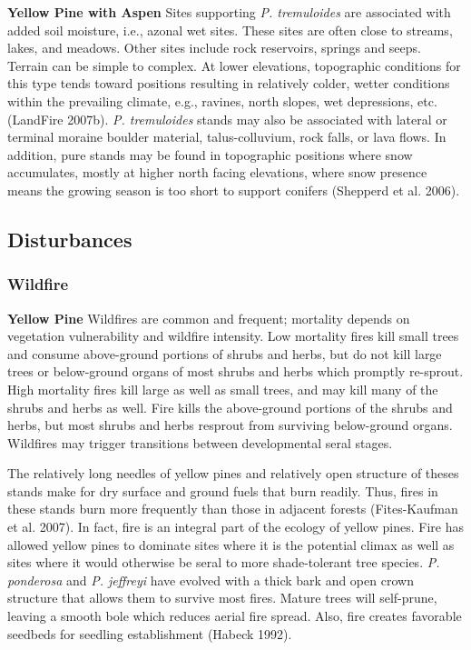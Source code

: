 \textbf{Yellow Pine with Aspen}	Sites supporting \emph{P. tremuloides} are associated with added soil moisture, i.e., azonal wet sites. These sites are often close to streams, lakes, and meadows. Other sites include rock reservoirs, springs and seeps. Terrain can be simple to complex. At lower elevations, topographic conditions for this type tends toward positions resulting in relatively colder, wetter conditions within the prevailing climate, e.g., ravines, north slopes, wet depressions, etc. (LandFire 2007b). \emph{P. tremuloides} stands may also be associated with lateral or terminal moraine boulder material, talus-colluvium, rock falls, or lava flows. In addition, pure stands may be found in topographic positions where snow accumulates, mostly at higher north facing elevations, where snow presence means the growing season is too short to support conifers (Shepperd et al. 2006). 


\subsection*{Disturbances}

\subsubsection*{Wildfire}
\textbf{Yellow Pine} Wildfires are common and frequent; mortality depends on vegetation vulnerability and wildfire intensity. Low mortality fires kill small trees and consume above-ground portions of shrubs and herbs, but do not kill large trees or below-ground organs of most shrubs and herbs which promptly re-sprout. High mortality fires kill large as well as small trees, and may kill many of the shrubs and herbs as well. Fire kills the above-ground portions of the shrubs and herbs, but most shrubs and herbs resprout from surviving below-ground organs. Wildfires may trigger transitions between developmental seral stages.

The relatively long needles of yellow pines and relatively open structure of theses stands make for dry surface and ground fuels that burn readily. Thus, fires in these stands burn more frequently than those in adjacent forests (Fites-Kaufman et al. 2007). In fact, fire is an integral part of the ecology of yellow pines. Fire has allowed yellow pines to dominate sites where it is the potential climax as well as sites where it would otherwise be seral to more shade-tolerant tree species. \emph{P. ponderosa} and \emph{P. jeffreyi} have evolved with a thick bark and open crown structure that allows them to survive most fires. Mature trees will self-prune, leaving a smooth bole which reduces aerial fire spread. Also, fire creates favorable seedbeds for seedling establishment (Habeck 1992). 

